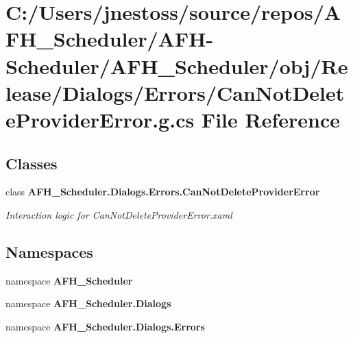 \section{C\+:/\+Users/jnestoss/source/repos/\+A\+F\+H\+\_\+\+Scheduler/\+A\+F\+H-\/\+Scheduler/\+A\+F\+H\+\_\+\+Scheduler/obj/\+Release/\+Dialogs/\+Errors/\+Can\+Not\+Delete\+Provider\+Error.g.\+cs File Reference}
\label{_release_2_dialogs_2_errors_2_can_not_delete_provider_error_8g_8cs}
\subsection*{Classes}
\begin{DoxyCompactItemize}
\item 
class \textbf{ A\+F\+H\+\_\+\+Scheduler.\+Dialogs.\+Errors.\+Can\+Not\+Delete\+Provider\+Error}
\begin{DoxyCompactList}\small\item\em Interaction logic for Can\+Not\+Delete\+Provider\+Error.\+xaml \end{DoxyCompactList}\end{DoxyCompactItemize}
\subsection*{Namespaces}
\begin{DoxyCompactItemize}
\item 
namespace \textbf{ A\+F\+H\+\_\+\+Scheduler}
\item 
namespace \textbf{ A\+F\+H\+\_\+\+Scheduler.\+Dialogs}
\item 
namespace \textbf{ A\+F\+H\+\_\+\+Scheduler.\+Dialogs.\+Errors}
\end{DoxyCompactItemize}
